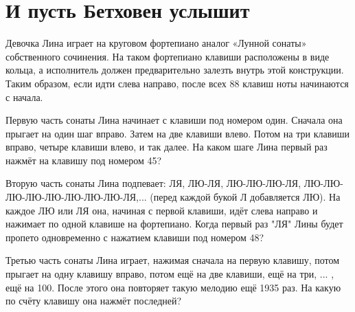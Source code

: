 \section{И пусть Бетховен услышит}

\noindent Девочка Лина играет на круговом фортепиано аналог «Лунной сонаты» собственного сочинения. На таком фортепиано клавиши расположены в виде кольца, а исполнитель должен предварительно залезть внутрь этой конструкции. Таким образом, если идти слева направо, после всех 88 клавиш ноты начинаются с начала.
\begin{itemize}

\itA Первую часть сонаты Лина начинает с клавиши под номером один. Сначала она прыгает на один шаг вправо. Затем на две клавиши влево. Потом на три клавиши вправо, четыре клавиши влево, и так далее. На каком шаге Лина первый раз нажмёт на клавишу под номером 45?

\itB Вторую часть сонаты Лина подпевает: ЛЯ, ЛЮ-ЛЯ, ЛЮ-ЛЮ-ЛЮ-ЛЯ, ЛЮ-ЛЮ-ЛЮ-ЛЮ-ЛЮ-ЛЮ-ЛЮ-ЛЮ-ЛЯ,... (перед каждой букой Л добавляется ЛЮ). На каждое ЛЮ или ЛЯ она, начиная с первой клавиши, идёт слева направо и нажимает по одной клавише на фортепиано. Когда первый раз "ЛЯ" Лины будет пропето одновременно с нажатием клавиши под номером 48?

\itC Третью часть сонаты Лина играет, нажимая сначала на первую клавишу, потом прыгает на одну клавишу вправо, потом ещё на две клавиши, ещё на три, ... , ещё на 100. После этого она повторяет такую мелодию ещё 1935 раз. На какую по счёту клавишу она нажмёт последней?
\end{itemize}